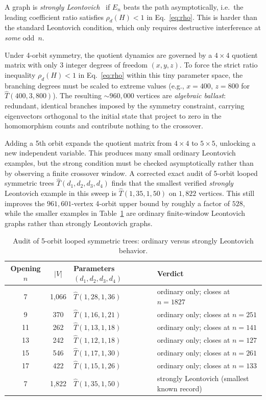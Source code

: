 \begin{remark}
\label{rem:ballast}
A graph is \emph{strongly Leontovich}~\cite{galvin2026} if
$E_n$ beats the path asymptotically, i.e.\ the leading coefficient ratio
satisfies $\rho_d(H) < 1$ in Eq.~\eqref{eq:rho}.  This is harder than
the standard Leontovich condition, which only requires destructive
interference at \emph{some} odd~$n$.

Under 4-orbit symmetry, the quotient dynamics are governed by a
$4 \times 4$ quotient matrix with only 3 integer degrees of freedom
$(x, y, z)$.  To force the strict ratio inequality $\rho_d(H) < 1$ in
Eq.~\eqref{eq:rho} within this tiny parameter space, the branching degrees
must be scaled to extreme values (e.g., $x = 400$, $z = 800$ for
$\hat{T}(400, 3, 800)$).  The resulting $\sim\!960{,}000$ vertices are
\emph{algebraic ballast}: redundant, identical branches imposed by the
symmetry constraint, carrying eigenvectors orthogonal to the initial state
that project to zero in the homomorphism counts and contribute nothing to
the crossover.

Adding a 5th orbit expands the quotient matrix from $4 \times 4$ to
$5 \times 5$, unlocking a new independent variable.  This produces many
small ordinary Leontovich examples, but the strong condition must be checked
asymptotically rather than by observing a finite crossover window.  A corrected
exact audit of 5-orbit looped symmetric trees
$\hat{T}(d_1, d_2, d_3, d_4)$ finds that the smallest verified
\textit{strongly} Leontovich example in this sweep is
$\hat{T}(1, 35, 1, 50)$ on $1{,}822$ vertices.  This still improves the
$961{,}601$-vertex 4-orbit upper bound by roughly a factor of $528$, while the
smaller examples in Table~\ref{tab:strong_frontier} are ordinary finite-window
Leontovich graphs rather than strongly Leontovich graphs.

\begin{table}[H]
\centering
\caption{Audit of 5-orbit looped symmetric trees: ordinary versus strongly Leontovich behavior.}
\label{tab:strong_frontier}
\begin{tabular}{@{}ccll@{}}
\toprule
Opening $n$ & $|V|$ & Parameters $(d_1, d_2, d_3, d_4)$ & Verdict \\
\midrule
7 & 1,066 & $\hat{T}(1, 28, 1, 36)$ & ordinary only; closes at $n=1827$ \\
9 & 370 & $\hat{T}(1, 16, 1, 21)$ & ordinary only; closes at $n=251$ \\
11 & 262 & $\hat{T}(1, 13, 1, 18)$ & ordinary only; closes at $n=141$ \\
13 & 242 & $\hat{T}(1, 12, 1, 18)$ & ordinary only; closes at $n=127$ \\
15 & 546 & $\hat{T}(1, 17, 1, 30)$ & ordinary only; closes at $n=261$ \\
17 & 422 & $\hat{T}(1, 15, 1, 26)$ & ordinary only; closes at $n=133$ \\
\midrule
7 & 1,822 & $\hat{T}(1, 35, 1, 50)$ & strongly Leontovich (smallest known record) \\
\bottomrule
\end{tabular}
\end{table}
\end{remark}

